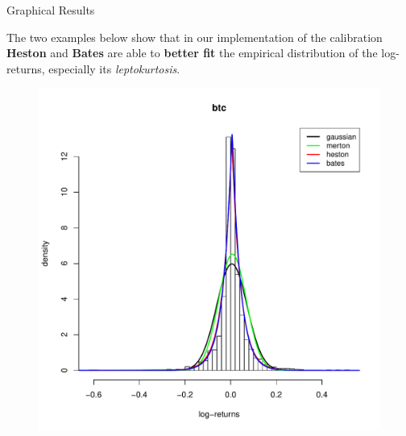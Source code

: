 \documentclass[c, 10pt]{beamer}
\begin{document}
\begin{frame}{Graphical Results}

The two examples below show that in our implementation of the calibration \textbf{Heston} and \textbf{Bates} are able to \textbf{better fit} the empirical distribution of the log-returns, especially its \textit{leptokurtosis}.

\begin{figure}[ht]
	\begin{minipage}[b]{0.45\linewidth}
		\footnotesize
		\centering
		\includegraphics[width=\textwidth]{Images/hist_btc.pdf}


\end{minipage}
\end{figure}
\end{frame}
\end{document}
